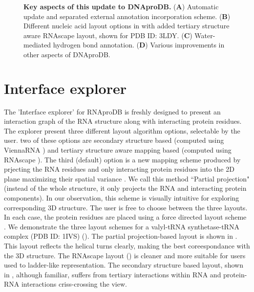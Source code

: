 \begin{center}
    \begin{figure}
        \caption[Key aspects of this update to DNAproDB.]{\textbf{Key aspects of this update to DNAproDB.} ({\bf A}) Automatic update and separated external annotation incorporation scheme.  ({\bf B})  Different nucleic acid layout options in with added tertiary structure aware RNAscape layout, shown for PDB ID: 3LDY. ({\bf C}) Water-mediated hydrogen bond annotation. ({\bf D}) Various improvements in other aspects of DNAproDB. }
  \label{fig:rnaprodb1}
\end{figure}
\end{center}

\section{Interface explorer}

The 'Interface explorer' for RNAproDB is freshly designed to present an interaction graph of the RNA structure along with interacting protein residues. The explorer present three different layout algorithm options, selectable by the user. two of these options are secondary structure based (computed using ViennaRNA \citep{Lorenz2011}) and tertiary structure aware mapping based (computed using RNAscape \citep{Mitra2024rnascape}). The third (default) option is a new mapping scheme produced by prjecting the RNA residues and only interacting protein residues into the 2D plane maximizing their spatial variance \citep{Pearson1901}. We call this method ``Partial projection" (instead of the whole structure, it only projects the RNA and interacting protein components). In our observation, this scheme is visually intuitive for exploring corresponding 3D structure. The user is free to choose between the three layouts. In each case, the protein residues are placed using a force directed layout scheme \citep{bostock2012fl}. We demonstrate the three layout schemes for a valyl-tRNA synthetase-tRNA complex (PDB ID: 1IVS) (). The partial projection-based layout is shown in . This layout reflects the helical turns clearly, making the best coreespondance with the 3D structure. The RNAscape \citep{Mitra2024rnascape} layout () is cleaner and more suitable for users used to ladder-like representation.  The secondary structure based layout, shown in , although familiar, suffers from tertiary interactions within RNA and protein-RNA interactions criss-crossing the view. 

